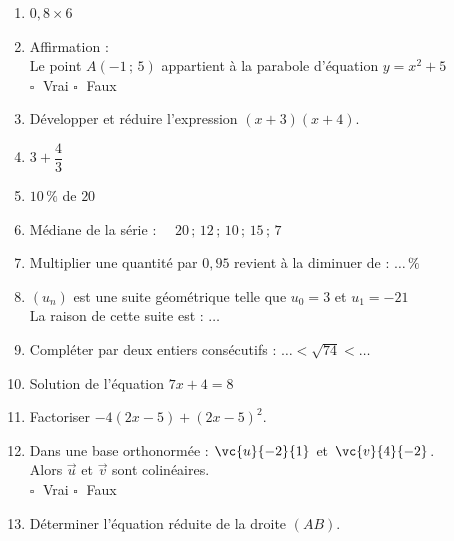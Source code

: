 \documentclass[a4paper,11pt,landscape,exos]{nsi} %
\begin{document}
\begin{multicols}{2}
\maketitle

\begin{enumerate}[]
	\item $0{,}8\times6$
	\item Affirmation : \\
    Le point $A(-1\,;\,5)$ appartient à la parabole d'équation $y=x^2+5$ \\	$\square\;$ Vrai \qquad $\square\;$ Faux\qquad 
	\item Développer et réduire l'expression $(x+3)(x+4)$.
	\item $3+\dfrac{4}{3}$ 
	\item $10\,\%$ de $20$
	\item Médiane de la série : $\quad 20\,;\,12\,;\,10\,;\,15\,;\,7$
	\item Multiplier une quantité par $0{,}95$ revient à la diminuer de : $\ldots\,\%$
	\item $(u_n)$ est une suite géométrique telle que $u_0=3$ et $u_1=-21$\\La raison de cette suite est :  $\ldots$
	\item Compléter par deux entiers consécutifs : $\ldots < \sqrt{74} < \ldots$
	\item Solution de l'équation $7x+4=8$
	\item  Factoriser   $-4(2x-5)+(2x-5)^2$.
	\item Dans une base orthonormée : $\vc{u}{-2}{1}$ et  $\vc{v}{4}{-2}$.\\
    Alors $\vec{u}$ et $\vec{v}$ sont colinéaires.\\	$\square\;$ Vrai \qquad $\square\;$ Faux\qquad
	\item Déterminer l'équation réduite de la droite $(AB)$.\\    \begin{tikzpicture}[baseline,scale = 0.6]


\end{tikzpicture}
\end{enumerate}
\end{multicols}
\end{document}
